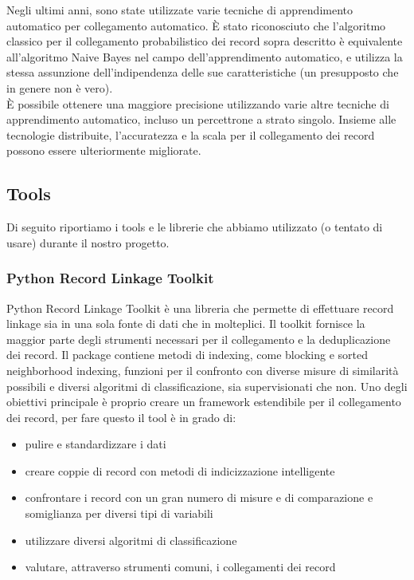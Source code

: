 \documentclass[a4paper,12pt]{article}
\begin{document}
\begin{description}[align=left]
	\item[Machine learning] Negli ultimi anni, sono state utilizzate varie tecniche di apprendimento automatico per collegamento automatico. È stato riconosciuto che l'algoritmo classico per il collegamento probabilistico dei record sopra descritto è equivalente all'algoritmo Naive Bayes nel campo dell'apprendimento automatico, e utilizza la stessa assunzione dell'indipendenza delle sue caratteristiche (un presupposto che in genere non è vero).\\È possibile ottenere una maggiore precisione utilizzando varie altre tecniche di apprendimento automatico, incluso un percettrone a strato singolo. Insieme alle tecnologie distribuite, l'accuratezza e la scala per il collegamento dei record possono essere ulteriormente migliorate.	
\end{description}

\subsection{Tools}
Di seguito riportiamo i tools e le librerie che abbiamo utilizzato (o tentato di usare) durante il nostro progetto.

\subsubsection{Python Record Linkage Toolkit}
Python Record Linkage Toolkit è una libreria che permette di effettuare record linkage sia in una sola fonte di dati che in molteplici. Il toolkit fornisce la maggior parte degli strumenti necessari per il collegamento e la deduplicazione dei record.
Il package contiene metodi di indexing, come blocking e sorted neighborhood indexing, funzioni per il confronto con diverse misure di similarità possibili e diversi algoritmi di classificazione, sia supervisionati che non. 
Uno degli obiettivi principale è proprio creare un framework estendibile per il collegamento dei record, per fare questo il tool è in grado di:
\newpage
\begin{itemize}
\item pulire e standardizzare i dati
\item creare coppie di record con metodi di indicizzazione intelligente
\item confrontare i record con un gran numero di misure e di comparazione e somiglianza per diversi tipi di variabili
\item utilizzare diversi algoritmi di classificazione
\item valutare, attraverso strumenti comuni, i collegamenti dei record
\end{itemize} 
\end{document}
